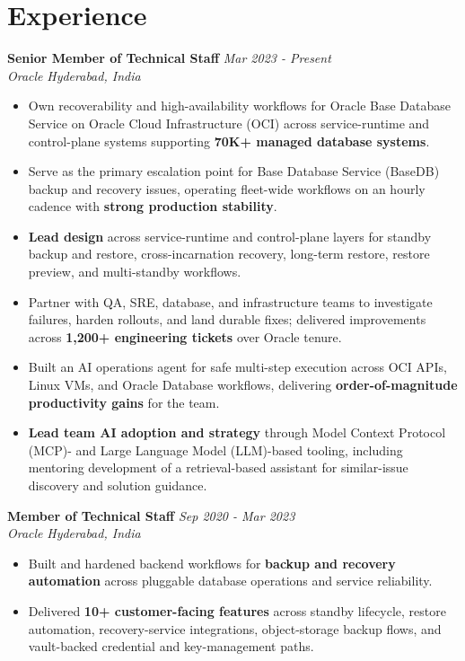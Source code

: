 \documentclass[10pt,letterpaper]{article}
\newcommand{\resumejob}[4]{%
  \textbf{#3} \hfill \textit{#4}\\
  \textit{#1} \hfill \textit{#2}\\[-0.9em]
}
\begin{document}
\section*{Experience}
\resumejob{Oracle}{Hyderabad, India}{Senior Member of Technical Staff}{Mar 2023 - Present}
\begin{itemize}
  \item Own recoverability and high-availability workflows for Oracle Base Database Service on Oracle Cloud Infrastructure (OCI) across service-runtime and control-plane systems supporting \textbf{70K+ managed database systems}.
  \item Serve as the primary escalation point for Base Database Service (BaseDB) backup and recovery issues, operating fleet-wide workflows on an hourly cadence with \textbf{strong production stability}.
  \item \textbf{Lead design} across service-runtime and control-plane layers for standby backup and restore, cross-incarnation recovery, long-term restore, restore preview, and multi-standby workflows.
  \item Partner with QA, SRE, database, and infrastructure teams to investigate failures, harden rollouts, and land durable fixes; delivered improvements across \textbf{1,200+ engineering tickets} over Oracle tenure.
  \item Built an AI operations agent for safe multi-step execution across OCI APIs, Linux VMs, and Oracle Database workflows, delivering \textbf{order-of-magnitude productivity gains} for the team.
  \item \textbf{Lead team AI adoption and strategy} through Model Context Protocol (MCP)- and Large Language Model (LLM)-based tooling, including mentoring development of a retrieval-based assistant for similar-issue discovery and solution guidance.
\end{itemize}

\vspace{0.18em}
\textbf{Member of Technical Staff} \hfill \textit{Sep 2020 - Mar 2023}\\
\textit{Oracle} \hfill \textit{Hyderabad, India}\\[-0.9em]
\begin{itemize}
  \item Built and hardened backend workflows for \textbf{backup and recovery automation} across pluggable database operations and service reliability.
  \item Delivered \textbf{10+ customer-facing features} across standby lifecycle, restore automation, recovery-service integrations, object-storage backup flows, and vault-backed credential and key-management paths.
\end{itemize}
\end{document}
